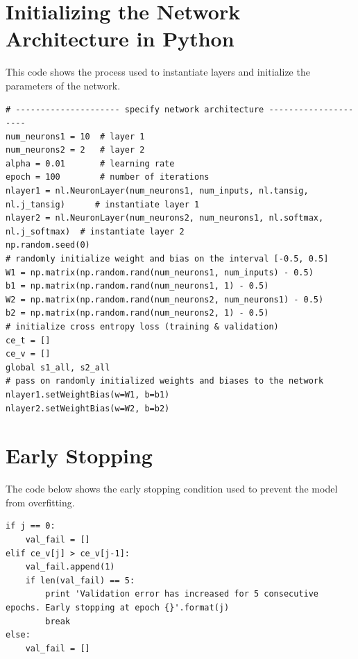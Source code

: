 \documentclass[12pt,halfline,a4paper]{ouparticle}
\begin{document}
\section{Initializing the Network Architecture in Python}
This code shows the process used to instantiate layers and initialize the parameters of the network. 

\begin{lstlisting}[style = Python]
# --------------------- specify network architecture ---------------------
num_neurons1 = 10  # layer 1
num_neurons2 = 2   # layer 2
alpha = 0.01       # learning rate
epoch = 100        # number of iterations
nlayer1 = nl.NeuronLayer(num_neurons1, num_inputs, nl.tansig, nl.j_tansig)      # instantiate layer 1
nlayer2 = nl.NeuronLayer(num_neurons2, num_neurons1, nl.softmax, nl.j_softmax)  # instantiate layer 2
np.random.seed(0)
# randomly initialize weight and bias on the interval [-0.5, 0.5]
W1 = np.matrix(np.random.rand(num_neurons1, num_inputs) - 0.5)
b1 = np.matrix(np.random.rand(num_neurons1, 1) - 0.5)
W2 = np.matrix(np.random.rand(num_neurons2, num_neurons1) - 0.5)
b2 = np.matrix(np.random.rand(num_neurons2, 1) - 0.5)
# initialize cross entropy loss (training & validation)
ce_t = []
ce_v = []
global s1_all, s2_all
# pass on randomly initialized weights and biases to the network
nlayer1.setWeightBias(w=W1, b=b1)
nlayer2.setWeightBias(w=W2, b=b2)
\end{lstlisting} 
\pagebreak

\section{Early Stopping}
The code below shows the early stopping condition used to prevent the model from overfitting. 

\begin{lstlisting}[style = Python]
if j == 0:
	val_fail = []
elif ce_v[j] > ce_v[j-1]:
	val_fail.append(1)
	if len(val_fail) == 5:
		print 'Validation error has increased for 5 consecutive epochs. Early stopping at epoch {}'.format(j)
		break
else:
	val_fail = []
\end{lstlisting} 
\end{document}
